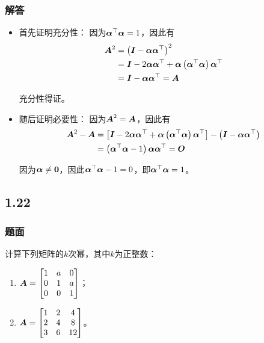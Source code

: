 \documentclass{beamer}
\begin{document}
\begin{frame}
\frametitle{解答}

    \begin{itemize}
        \item 首先证明充分性：
              因为\(\boldsymbol{\alpha}^\top\boldsymbol{\alpha}=1\)，因此有
              \begin{align*}
                  \boldsymbol{A}^2 & =\left( \boldsymbol{I}-\boldsymbol{\alpha}\boldsymbol{\alpha}^\top \right)^2                                   \\
                          & =\boldsymbol{I}-2\boldsymbol{\alpha}\boldsymbol{\alpha}^\top+\boldsymbol{\alpha}\left( \boldsymbol{\alpha}^\top\boldsymbol{\alpha} \right)\boldsymbol{\alpha}^\top \\
                          & =\boldsymbol{I}-\boldsymbol{\alpha}\boldsymbol{\alpha}^\top=\boldsymbol{A}
              \end{align*}

              充分性得证。
              \pause
        \item 随后证明必要性：
              因为\(\boldsymbol{A}^2=\boldsymbol{A}\)，因此有
              \begin{align*}
                  \boldsymbol{A}^2-\boldsymbol{A} & =\left[ \boldsymbol{I}-2\boldsymbol{\alpha}\boldsymbol{\alpha}^\top+\boldsymbol{\alpha}\left( \boldsymbol{\alpha}^\top\boldsymbol{\alpha} \right)\boldsymbol{\alpha}^\top \right]-\left( \boldsymbol{I}-\boldsymbol{\alpha}\boldsymbol{\alpha}^\top \right) \\
                                & =\left( \boldsymbol{\alpha}^\top\boldsymbol{\alpha}-1 \right)\boldsymbol{\alpha}\boldsymbol{\alpha}^\top=\boldsymbol{O}
              \end{align*}

              因为\(\boldsymbol{\alpha}\neq\boldsymbol{0}\)，因此\(\boldsymbol{\alpha}^\top\boldsymbol{\alpha}-1=0\)，即\(\boldsymbol{\alpha}^\top\boldsymbol{\alpha}=1\)。
    \end{itemize}

\end{frame}

\subsection*{1.22}

\begin{frame}
    \frametitle{题面}

    计算下列矩阵的\(k\)次幂，其中\(k\)为正整数：

    \begin{enumerate}
        \item \(\boldsymbol{A}=\begin{bmatrix}1&a&0\\0&1&a\\0&0&1\end{bmatrix}\)；
        \item \(\boldsymbol{A}=\begin{bmatrix}1&2&4\\2&4&8\\3&6&12\end{bmatrix}\)。
    \end{enumerate}

\end{frame}
\end{document}
